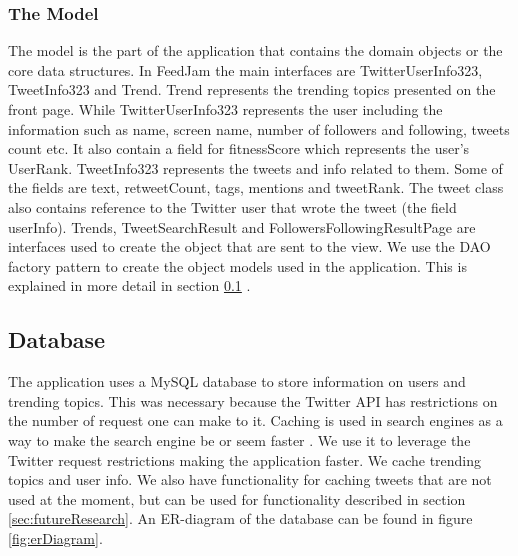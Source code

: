 \subsubsection{The Model} %
The model is the part of the application that contains the domain objects or the core data structures. In FeedJam the main interfaces are TwitterUserInfo323, TweetInfo323 and Trend. Trend represents the trending topics presented on the front page. While TwitterUserInfo323 represents the user including the information such as name, screen name, number of followers and following, tweets count etc. It also contain a field for fitnessScore which represents the user's UserRank. TweetInfo323 represents the tweets and info related to them. Some of the fields are text, retweetCount, tags, mentions and tweetRank. The tweet class also contains reference to the Twitter user that wrote the tweet (the field userInfo). Trends, TweetSearchResult and FollowersFollowingResultPage are interfaces used to create the object that are sent to the view. We use the DAO factory pattern to create the object models used in the application. This is explained in more detail in section \ref{sec:feedJamDatabase} .

\subsection{Database} %
\label{sec:feedJamDatabase}
The application uses a MySQL database to store information on users and trending topics. This was necessary because the Twitter API has restrictions on the number of request one can make to it. Caching is used in search engines as a way to make the search engine be or seem faster \citep{Baeza-Yates2011}. We use it to leverage the Twitter request restrictions making the application faster. We cache trending topics and user info. We also have functionality for caching tweets that are not used at the moment, but can be used for functionality described in  section \ref{sec:futureResearch}. An ER-diagram of the database can be found in figure \ref{fig:erDiagram}.

